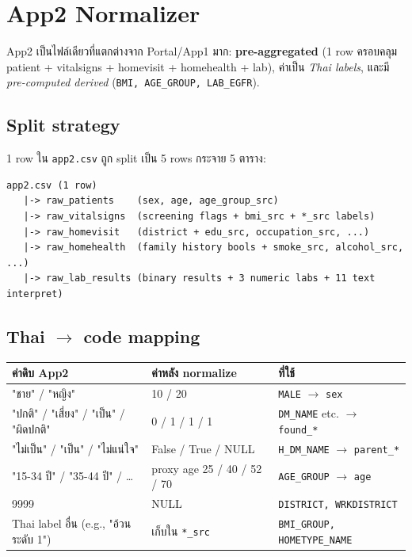 \documentclass[11pt,a4paper]{article}
\begin{document}
\section{App2 Normalizer}

App2 เป็นไฟล์เดียวที่แตกต่างจาก Portal/App1 มาก: \textbf{pre-aggregated} (1 row ครอบคลุม
patient + vitalsigns + homevisit + homehealth + lab), ค่าเป็น \textit{Thai labels},
และมี \textit{pre-computed derived} (\texttt{BMI, AGE\_GROUP, LAB\_EGFR}).

\subsection{Split strategy}

1 row ใน \texttt{app2.csv} ถูก split เป็น 5 rows กระจาย 5 ตาราง:

\begin{lstlisting}[style=shellstyle]
app2.csv (1 row)
   |-> raw_patients    (sex, age, age_group_src)
   |-> raw_vitalsigns  (screening flags + bmi_src + *_src labels)
   |-> raw_homevisit   (district + edu_src, occupation_src, ...)
   |-> raw_homehealth  (family history bools + smoke_src, alcohol_src, ...)
   |-> raw_lab_results (binary results + 3 numeric labs + 11 text interpret)
\end{lstlisting}

\subsection{Thai $\rightarrow$ code mapping}

\begin{center}
\footnotesize
\begin{tabularx}{\linewidth}{L{4.5cm} L{4cm} X}
\toprule
\textbf{ค่าดิบ App2} & \textbf{ค่าหลัง normalize} & \textbf{ที่ใช้} \\
\midrule
"ชาย" / "หญิง"                         & 10 / 20                    & \texttt{MALE} $\rightarrow$ \texttt{sex} \\
"ปกติ" / "เสี่ยง" / "เป็น" / "ผิดปกติ"    & 0 / 1 / 1 / 1              & \texttt{DM\_NAME} etc. $\rightarrow$ \texttt{found\_*} \\
"ไม่เป็น" / "เป็น" / "ไม่แน่ใจ"           & False / True / NULL        & \texttt{H\_DM\_NAME} $\rightarrow$ \texttt{parent\_*} \\
"15-34 ปี" / "35-44 ปี" / \ldots        & proxy age 25 / 40 / 52 / 70 & \texttt{AGE\_GROUP} $\rightarrow$ \texttt{age} \\
9999                                   & NULL                        & \texttt{DISTRICT, WRKDISTRICT} \\
Thai label อื่น (e.g., "อ้วนระดับ 1")    & เก็บใน \texttt{*\_src}     & \texttt{BMI\_GROUP, HOMETYPE\_NAME} \\
\bottomrule
\end{tabularx}
\end{center}
\end{document}
